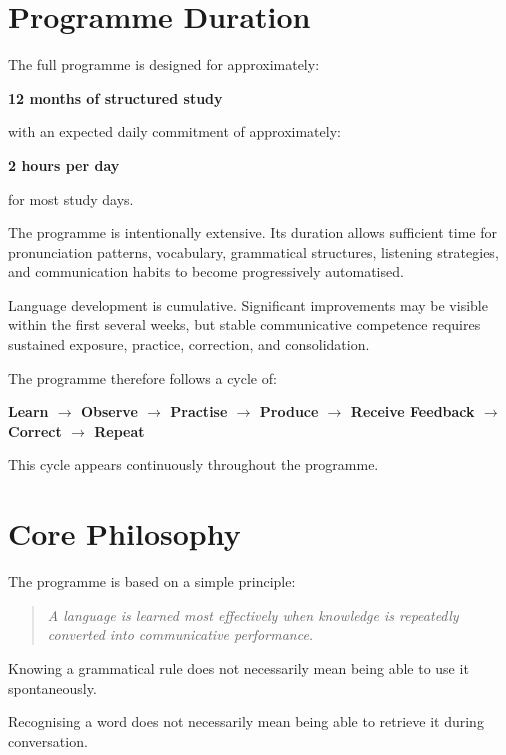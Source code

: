 \section*{Programme Duration}

The full programme is designed for approximately:

\begin{center}
\textbf{12 months of structured study}
\end{center}

with an expected daily commitment of approximately:

\begin{center}
\textbf{2 hours per day}
\end{center}

for most study days.

The programme is intentionally extensive. Its duration allows sufficient time for pronunciation patterns, vocabulary, grammatical structures, listening strategies, and communication habits to become progressively automatised.

Language development is cumulative. Significant improvements may be visible within the first several weeks, but stable communicative competence requires sustained exposure, practice, correction, and consolidation.

The programme therefore follows a cycle of:

\begin{center}
\textbf{Learn $\rightarrow$ Observe $\rightarrow$ Practise $\rightarrow$ Produce $\rightarrow$ Receive Feedback $\rightarrow$ Correct $\rightarrow$ Repeat}
\end{center}

This cycle appears continuously throughout the programme.

\section*{Core Philosophy}

The programme is based on a simple principle:

\begin{quote}
\textit{A language is learned most effectively when knowledge is repeatedly converted into communicative performance.}
\end{quote}

Knowing a grammatical rule does not necessarily mean being able to use it spontaneously.

Recognising a word does not necessarily mean being able to retrieve it during conversation.

